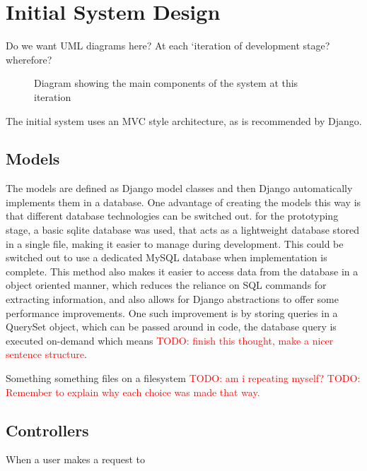 \documentclass[a4paper,11pt]{report}
\newcommand{\todo}[1]{\textcolor{red}{TODO: #1}}
\begin{document}
\section{Initial System Design}
Do we want UML diagrams here? At each `iteration of development stage? wherefore?
\begin{figure}[ht]
\centering
{}
\caption{Diagram showing the main components of the system at this iteration}
\label{fig:i1sysd}
\end{figure}
The initial system uses an MVC style architecture, as is recommended by Django.
\subsection{Models}
The models are defined as Django model classes and then Django automatically implements them in a database. One advantage of creating the models this way is that different database technologies can be switched out. for the prototyping stage, a basic sqlite database was used, that acts as a lightweight database stored in a single file, making it easier to manage during development. This could be switched out to use a dedicated MySQL database when implementation is complete. This method also makes it easier to access data from the database in a object oriented manner, which reduces the reliance on SQL commands for extracting information, and also allows for Django abstractions to offer some performance improvements. One such improvement is by storing queries in a QuerySet object, which can be passed around in code, the database query is executed on-demand which means \todo{finish this thought, make a nicer sentence structure}.\par
Something something files on a filesystem \todo{am i repeating myself?}
\todo{Remember to explain why each choice was made that way.}
\subsection{Controllers}
When a user makes a request to 
\end{document}
